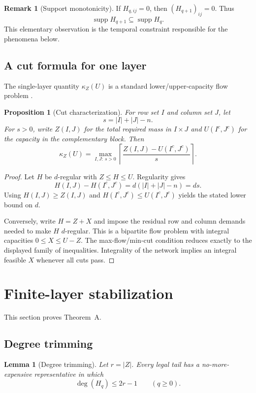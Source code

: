 \documentclass[11pt]{article}
\newtheorem{proposition}[theorem]{Proposition}
\newtheorem{lemma}[theorem]{Lemma}
\theoremstyle{definition}
\newtheorem{remark}[theorem]{Remark}
\newcommand{\supp}{\operatorname{supp}}
\newcommand{\degm}{\operatorname{deg}}
\begin{document}
\begin{remark}[Support monotonicity]
If $H_{q,ij}=0$, then $(H_{q+1})_{ij}=0$.  Thus
\[
\supp H_{q+1}\subseteq\supp H_q.
\]
This elementary observation is the temporal constraint responsible for the phenomena below.
\end{remark}

\subsection{A cut formula for one layer}

The single-layer quantity $\kappa_Z(U)$ is a standard lower/upper-capacity flow problem
\cite{hoffman1974}.

\begin{proposition}[Cut characterization]
\label{prop:cut}
For row set $I$ and column set $J$, let
\[
s=|I|+|J|-n.
\]
For $s>0$, write $Z(I,J)$ for the total required mass in $I\times J$ and
$U(I^c,J^c)$ for the capacity in the complementary block.  Then
\[
\kappa_Z(U)
=
\max_{I,J:\ s>0}
\left\lceil
\frac{Z(I,J)-U(I^c,J^c)}{s}
\right\rceil.
\]
\end{proposition}

\begin{proof}
Let $H$ be $d$-regular with $Z\le H\le U$.  Regularity gives
\[
H(I,J)-H(I^c,J^c)=d(|I|+|J|-n)=ds.
\]
Using $H(I,J)\ge Z(I,J)$ and $H(I^c,J^c)\le U(I^c,J^c)$ yields the stated
lower bound on $d$.

Conversely, write $H=Z+X$ and impose the residual row and column demands needed to make
$H$ $d$-regular.  This is a bipartite flow problem with integral capacities
$0\le X\le U-Z$.  The max-flow/min-cut condition reduces exactly to the displayed family of
inequalities.  Integrality of the network implies an integral feasible $X$ whenever all cuts
pass.
\end{proof}

\section{Finite-layer stabilization}
\label{sec:finite}

This section proves Theorem~A.

\subsection{Degree trimming}

\begin{lemma}[Degree trimming]
\label{lem:trim}
Let $r=|Z|$.  Every legal tail has a no-more-expensive representative in which
\[
\degm(H_q)\le 2r-1
\qquad(q\ge0).
\]
\end{lemma}
\end{document}
